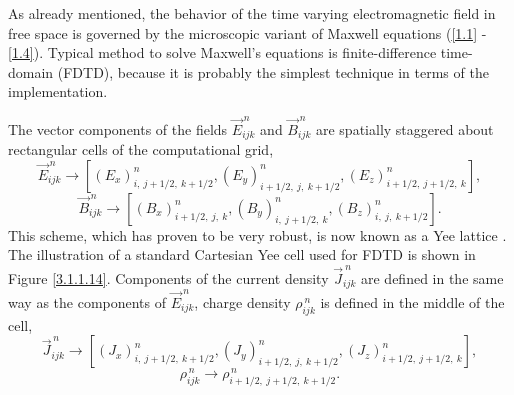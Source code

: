 As already mentioned, the behavior of the time varying electromagnetic field in free space is governed by the microscopic variant of Maxwell equations (\ref{1.1} - \ref{1.4}). Typical method to solve Maxwell's equations is finite-difference time-domain (FDTD), because it is probably the simplest technique in terms of the implementation.

The vector components of the fields $ \vec{E}_{ijk}^{\,n} $ and $ \vec{B}_{ijk}^{\,n} $ are spatially staggered about rectangular cells of the computational grid,
\begin{equation}
\label{3.1.1.4}
\vec{E}_{ijk}^{\,n} \rightarrow \left[\left(E_{x}\right)^{n}_{i,\: j + 1/2,\: k + 1/2}, \left(E_{y}\right)^{n}_{i + 1/2,\: j,\: k + 1/2}, \left(E_{z}\right)^{n}_{i + 1/2,\: j + 1/2,\: k} \right],
\end{equation}
\begin{equation}
\label{3.1.1.5}
\vec{B}_{ijk}^{\,n} \rightarrow \left[\left(B_{x}\right)^{n}_{i + 1/2,\: j,\: k}, \left(B_{y}\right)^{n}_{i,\: j + 1/2,\: k}, \left(B_{z}\right)^{n}_{i,\: j,\: k + 1/2} \right].
\end{equation}
This scheme, which has proven to be very robust, is now known as a Yee lattice \cite{yee}. The illustration of a standard Cartesian Yee cell used for FDTD is shown in Figure \ref{3.1.1.14}. Components of the current density $ \vec{J}_{ijk}^{\:n} $ are defined in the same way as the components of $ \vec{E}_{ijk}^{\:n} $, charge density $ \rho_{ijk}^{\:n} $ is defined in the middle of the cell,
\begin{equation}
\vec{J}_{ijk}^{\,n} \rightarrow \left[\left(J_{x}\right)^{n}_{i,\: j + 1/2,\: k + 1/2}, \left(J_{y}\right)^{n}_{i + 1/2,\: j,\: k + 1/2}, \left(J_{z}\right)^{n}_{i + 1/2,\: j + 1/2,\: k} \right],
\end{equation}
\begin{equation}
\rho_{ijk}^{\,n} \rightarrow \rho_{i + 1/2,\: j + 1/2,\: k + 1/2}^{\,n}.
\end{equation}

